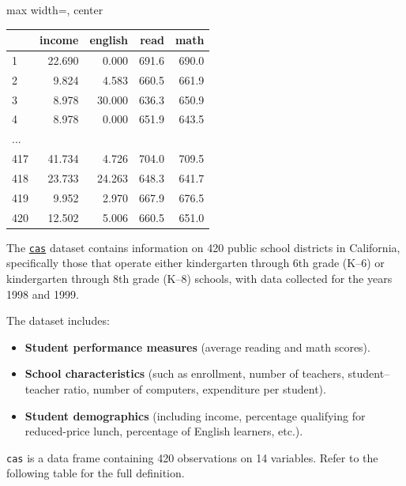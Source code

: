 \documentclass[
  12pt,
  a4paper,
]{scrbook}
\providecommand{\tightlist}{%
  \setlength{\itemsep}{0pt}\setlength{\parskip}{0pt}}
\renewcommand{\tightlist}{\setlength{\itemsep}{0.5\baselineskip}\setlength{\parskip}{0.2\baselineskip}}
\theoremstyle{plain}
\theoremstyle{definition}
\theoremstyle{remark}
\begin{document}
\par\medskip
\begin{adjustbox}{max width=\linewidth, center}
\begin{tabular}{lrrrr}
\toprule
  & income & english & read & math\\
\midrule
1 & 22.690 & 0.000 & 691.6 & 690.0\\
2 & 9.824 & 4.583 & 660.5 & 661.9\\
3 & 8.978 & 30.000 & 636.3 & 650.9\\
4 & 8.978 & 0.000 & 651.9 & 643.5\\
... &  &  &  & \\
417 & 41.734 & 4.726 & 704.0 & 709.5\\
418 & 23.733 & 24.263 & 648.3 & 641.7\\
419 & 9.952 & 2.970 & 667.9 & 676.5\\
420 & 12.502 & 5.006 & 660.5 & 651.0\\
\bottomrule
\end{tabular}
\end{adjustbox}
\endgroup

The
\href{https://www.rdocumentation.org/packages/AER/versions/1.2-15/topics/CASchools}{\texttt{cas}}
dataset contains information on 420 public school districts in
California, specifically those that operate either kindergarten through
6th grade (K--6) or kindergarten through 8th grade (K--8) schools, with
data collected for the years 1998 and 1999.

The dataset includes:

\begin{itemize}
\tightlist
\item
  \textbf{Student performance measures} (average reading and math
  scores).
\item
  \textbf{School characteristics} (such as enrollment, number of
  teachers, student--teacher ratio, number of computers, expenditure per
  student).
\item
  \textbf{Student demographics} (including income, percentage qualifying
  for reduced-price lunch, percentage of English learners, etc.).
\end{itemize}

\texttt{cas} is a data frame containing 420 observations on 14
variables. Refer to the following table for the full definition.

\end{document}
